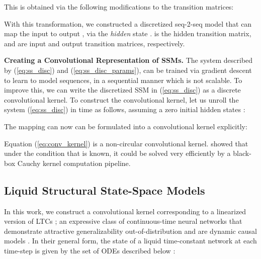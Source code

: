 \documentclass{MITcsail}
\begin{document}
\endgroup

This is obtained via the following modifications to the transition matrices:

\begingroup
\small

\endgroup

With this transformation, we constructed a discretized seq-2-seq model that can map the input  to output , via the \emph{hidden} state .  is the hidden transition matrix,  and  are input and output transition matrices, respectively. 


\noindent \textbf{Creating a Convolutional Representation of SSMs.} The system described by (\ref{eq:ss_disc}) and (\ref{eq:ss_disc_params}), can be trained via gradient descent to learn to model sequences, in a sequential manner which is not scalable. To improve this, we can write the discretized SSM in (\ref{eq:ss_disc}) as a discrete convolutional kernel. To construct the convolutional kernel, let us unroll the system (\ref{eq:ss_disc}) in time as follows, assuming a zero initial hidden states :

\begingroup
\small

\endgroup

The mapping  can now can be formulated into a convolutional kernel explicitly:

\begingroup
\small




\endgroup

Equation (\ref{eq:conv_kernel}) is a non-circular convolutional kernel. \cite{gu2022efficiently} showed that under the condition that  is known, it could be solved very efficiently by a black-box Cauchy kernel computation pipeline. 

\subsection{Liquid Structural State-Space Models}
In this work, we construct a convolutional kernel corresponding to a linearized version of LTCs \citep{hasani2021liquid}; an expressive class of continuous-time neural networks that demonstrate attractive generalizability out-of-distribution and are dynamic causal models \citep{vorbach2021causal,friston2003dynamic,hasani2020natural}. In their general form, the state of a liquid time-constant network at each time-step is given by the set of ODEs described below \citep{hasani2021liquid}: 

\begingroup
\small

\endgroup
\end{document}
